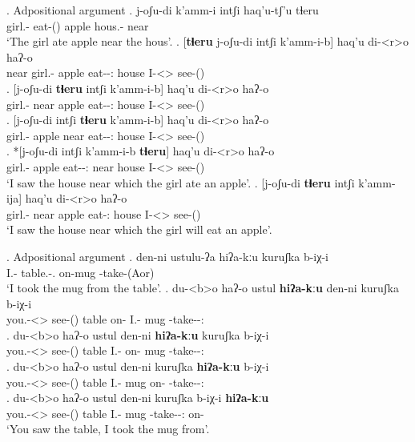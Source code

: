 \ex. Adpositional argument
	\ag. j-oʃu-di k'amm-i intʃi haq'u-tʃ'u tɬeru\\
			{girl.\Obl-\Erg} {eat-\Pst(\Aor)} apple {hous.\Obl-\Ads} near\\
			\glt `The girl ate apple near the hous'.
	\bg. 	[\textbf{tɬeru} j-oʃu-di  intʃi k'amm-i-b] haq'u di-<r>o haʔ-o\\
			near {girl.\Obl-\Erg} apple {eat-\Pst-\Ptcp:\Pst} house  {I-<\Nans>\Aff} {see-\Pst(\Aor)} \label{adposition-1}\\
	\bg. 	[j-oʃu-di \textbf{tɬeru} intʃi k'amm-i-b] haq'u di-<r>o haʔ-o\\
			{girl.\Obl-\Erg} near apple {eat-\Pst-\Ptcp:\Pst} house  {I-<\Nans>\Aff} {see-\Pst(\Aor)} \label{adposition-first}\\
	\bg. 	[j-oʃu-di intʃi \textbf{tɬeru} k'amm-i-b] haq'u di-<r>o haʔ-o\\
			{girl.\Obl-\Erg} apple near  {eat-\Pst-\Ptcp:\Pst} house  {I-<\Nans>\Aff} {see-\Pst(\Aor)} \\
	\bg. 	*[j-oʃu-di intʃi k'amm-i-b \textbf{tɬeru}] haq'u di-<r>o haʔ-o\\
			{girl.\Obl-\Erg} apple {eat-\Pst-\Ptcp:\Pst} near house  {I-<\Nans>\Aff} {see-\Pst(\Aor)} \\
			\glt `I saw the house near which the girl ate an apple'. \label{adposition-2}
	\bg. 	[j-oʃu-di \textbf{tɬeru} intʃi k'amm-ija] haq'u di-<r>o haʔ-o\\
			{girl.\Obl-\Erg} near apple {eat-\Ptcp:\Fut} house  {I-<\Nans>\Aff} {see-\Pst(\Aor)} \\
			\glt `I saw the house near which the girl will eat an apple'.

\ex. Adpositional argument
	\ag. den-ni ustulu-ʔa hiʔa-kːu kuruʃka b-iχ-i\\
			{I.\Obl-\Erg} {table.\Obl-\Super.\Elat} on-\Elat  mug \Nanf-take-\Pst(Aor)\\
			\glt `I took the mug from the table'.
	\bg. du-<b>o haʔ-o ustul \textbf{hiʔa-kːu} den-ni kuruʃka b-iχ-i\\
			{you.\Obl-<\Nanf>\Aff} {see-\Pst(\Aor)} table {on-\Elat} {I.\Obl-\Erg}  mug {\Nanf-take-\Pst-\Ptcp:\Pst}\\
	\bg. du-<b>o haʔ-o ustul den-ni \textbf{hiʔa-kːu} kuruʃka b-iχ-i\\
			{you.\Obl-<\Nanf>\Aff} {see-\Pst(\Aor)} table {I.\Obl-\Erg} {on-\Elat} mug {\Nanf-take-\Pst-\Ptcp:\Pst}\\
	\bg. du-<b>o haʔ-o ustul den-ni kuruʃka \textbf{hiʔa-kːu}  b-iχ-i\\
			{you.\Obl-<\Nanf>\Aff} {see-\Pst(\Aor)} table {I.\Obl-\Erg} mug {on-\Elat} {\Nanf-take-\Pst-\Ptcp:\Pst}\\
	\bg. du-<b>o haʔ-o ustul den-ni kuruʃka b-iχ-i \textbf{hiʔa-kːu}\\
			{you.\Obl-<\Nanf>\Aff} {see-\Pst(\Aor)} table {I.\Obl-\Erg} mug {\Nanf-take-\Pst-\Ptcp:\Pst} {on-\Elat}\\
			\glt `You saw the table, I took the mug from'.			

